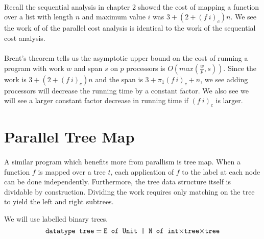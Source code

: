 \paragraph{}
Recall the sequential  analysis in chapter 2 showed the cost of
mapping a function  over a list  with length $n$ and maximum value
$i$ was $3 + (2 + (f\ i)_c)n$. We see the work of of the parallel cost analysis
is identical to the work of the sequential cost analysis.

\paragraph{}
Brent's theorem tells us the asymptotic upper bound on the cost of running a
program with work $w$ and span $s$ on $p$ processors is $O(max(\frac{w}{p},
s))$. Since the work is $3 + (2 + (f\ i)_c)n$ and the span is $3 + \pi_1(f\
i)_c + n$, we see adding processors will decrease the running time by a
constant factor. We also see we will see a larger constant factor decrease in
running time if $(f\ i)_c$ is larger.


\section{Parallel Tree Map}
\paragraph{}
A similar program which benefits more from parallism is tree map.  When a
function $f$ is mapped over a tree $t$, each application of $f$ to the label at
each node can be done independently.  Furthermore, the tree data structure
itself is dividable by construction.  Dividing the work requires only
matching on the tree to yield the left and right subtrees.

We will use  labelled binary trees.
%
\begin{equation*}
  \texttt{datatype tree} = \texttt{E of Unit | N of int$\times$tree$\times$tree}
\end{equation*}

